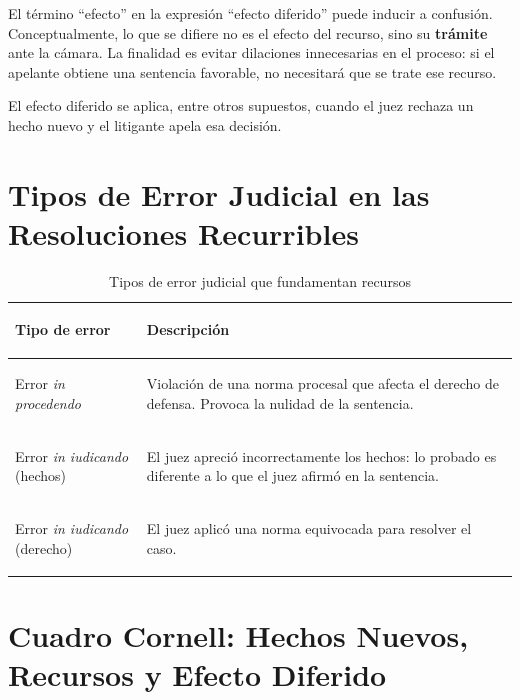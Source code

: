 \documentclass[12pt,oneside]{book}
\begin{document}
\begin{note}
El término ``efecto'' en la expresión ``efecto diferido'' puede inducir a confusión. Conceptualmente, lo que se difiere no es el efecto del recurso, sino su \textbf{trámite} ante la cámara. La finalidad es evitar dilaciones innecesarias en el proceso: si el apelante obtiene una sentencia favorable, no necesitará que se trate ese recurso.
\end{note}

El efecto diferido se aplica, entre otros supuestos, cuando el juez rechaza un hecho nuevo y el litigante apela esa decisión.

\section{Tipos de Error Judicial en las Resoluciones Recurribles}

\begin{table}[H]
\centering
\begin{tabularx}{\textwidth}{
    >{\bfseries\raggedright\arraybackslash}p{}
    >{\raggedright\arraybackslash}X
}
\toprule
\textbf{Tipo de error} & \textbf{Descripción} \\
\midrule
Error \textit{in procedendo} & Violación de una norma procesal que afecta el derecho de defensa. Provoca la nulidad de la sentencia. \\
\addlinespace
Error \textit{in iudicando} (hechos) & El juez apreció incorrectamente los hechos: lo probado es diferente a lo que el juez afirmó en la sentencia. \\
\addlinespace
Error \textit{in iudicando} (derecho) & El juez aplicó una norma equivocada para resolver el caso. \\
\bottomrule
\end{tabularx}
\caption{Tipos de error judicial que fundamentan recursos}
\end{table}

\section*{Cuadro Cornell: Hechos Nuevos, Recursos y Efecto Diferido}
\end{document}
